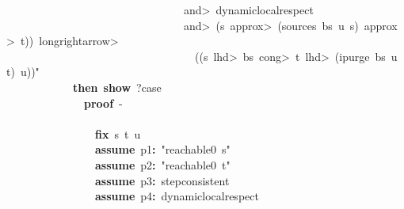 \documentclass{article}
\newcommand{\syntaxKEYWORDA}[1]{\textcolor[rgb]{0.0,0.4,0.6}{\textbf{#1}}}
\newcommand{\syntaxKEYWORDC}[1]{\textcolor[rgb]{0.0,0.6,1.0}{\textbf{#1}}}
\newcommand{\syntaxLITERALA}[1]{\textcolor[rgb]{1.0,0.0,0.8}{#1}}
\newcommand{\syntaxOPERATOR}[1]{\textcolor[rgb]{0.0,0.0,0.0}{\textbf{#1}}}
\newcommand{\syntaxKEYWORDA}[1]{\textcolor[rgb]{0.0,0.4,0.6}{\textbf{#1}}}
\newcommand{\syntaxKEYWORDC}[1]{\textcolor[rgb]{0.0,0.6,1.0}{\textbf{#1}}}
\newcommand{\syntaxLITERALA}[1]{\textcolor[rgb]{1.0,0.0,0.8}{#1}}
\newcommand{\syntaxOPERATOR}[1]{\textcolor[rgb]{0.0,0.0,0.0}{\textbf{#1}}}
\newcommand{\syntaxKEYWORDA}[1]{\textcolor[rgb]{0.0,0.4,0.6}{\textbf{#1}}}
\newcommand{\syntaxKEYWORDC}[1]{\textcolor[rgb]{0.0,0.6,1.0}{\textbf{#1}}}
\newcommand{\syntaxLITERALA}[1]{\textcolor[rgb]{1.0,0.0,0.8}{#1}}
\newcommand{\syntaxOPERATOR}[1]{\textcolor[rgb]{0.0,0.0,0.0}{\textbf{#1}}}
\newcommand{\syntaxKEYWORDA}[1]{\textcolor[rgb]{0.0,0.4,0.6}{#1}}
\newcommand{\syntaxKEYWORDC}[1]{\textcolor[rgb]{0.0,0.6,1.0}{#1}}
\newcommand{\syntaxLITERALA}[1]{\textcolor[rgb]{1.0,0.0,0.8}{\textbf{#1}}}
\newcommand{\syntaxOPERATOR}[1]{\textcolor[rgb]{0.0,0.0,0.0}{#1}}
\newcommand{\syntaxKEYWORDA}[1]{\textcolor[rgb]{0.0,0.4,0.6}{\textbf{#1}}}
\newcommand{\syntaxKEYWORDC}[1]{\textcolor[rgb]{0.0,0.6,1.0}{\textbf{#1}}}
\newcommand{\syntaxLITERALA}[1]{\textcolor[rgb]{1.0,0.0,0.8}{#1}}
\newcommand{\syntaxOPERATOR}[1]{\textcolor[rgb]{0.0,0.0,0.0}{\textbf{#1}}}
\newcommand{\syntaxKEYWORDA}[1]{\textcolor[rgb]{0.0,0.4,0.6}{\textbf{#1}}}
\newcommand{\syntaxKEYWORDC}[1]{\textcolor[rgb]{0.0,0.6,1.0}{\textbf{#1}}}
\newcommand{\syntaxLITERALA}[1]{\textcolor[rgb]{1.0,0.0,0.8}{#1}}
\newcommand{\syntaxOPERATOR}[1]{\textcolor[rgb]{0.0,0.0,0.0}{\textbf{#1}}}
\begin{document}
\syntaxLITERALA{{\ }{\ }{\ }{\ }{\ }{\ }{\ }{\ }{\ }{\ }{\ }{\ }{\ }{\ }{\ }{\ }{\ }{\ }{\ }{\ }{\ }{\ }{\ }{\ }{\ }{\ }{\ }{\ }{\ }{\ }{\ }{\ }\<and>{\ }dynamic\usebox{\underscorebox}local\usebox{\underscorebox}respect{\ }}\hspace*{\fill}\\
\syntaxLITERALA{{\ }{\ }{\ }{\ }{\ }{\ }{\ }{\ }{\ }{\ }{\ }{\ }{\ }{\ }{\ }{\ }{\ }{\ }{\ }{\ }{\ }{\ }{\ }{\ }{\ }{\ }{\ }{\ }{\ }{\ }{\ }{\ }\<and>{\ }(s{\ }\<approx>{\ }(sources{\ }bs{\ }u{\ }s){\ }\<approx>{\ }t)){\ }\<longrightarrow>}\hspace*{\fill}\\
\syntaxLITERALA{{\ }{\ }{\ }{\ }{\ }{\ }{\ }{\ }{\ }{\ }{\ }{\ }{\ }{\ }{\ }{\ }{\ }{\ }{\ }{\ }{\ }{\ }{\ }{\ }{\ }{\ }{\ }{\ }{\ }{\ }{\ }{\ }{\ }{\ }((s{\ }\<lhd>{\ }bs{\ }\<cong>{\ }t{\ }\<lhd>{\ }(ipurge{\ }bs{\ }u{\ }t){\ }\usebox{\atbox}{\ }u))"}\hspace*{\fill}\\
{\ }{\ }{\ }{\ }{\ }{\ }{\ }{\ }{\ }{\ }{\ }{\ }\syntaxKEYWORDA{then}{\ }\syntaxKEYWORDC{show}{\ }?case\hspace*{\fill}\\
{\ }{\ }{\ }{\ }{\ }{\ }{\ }{\ }{\ }{\ }{\ }{\ }{\ }{\ }\syntaxKEYWORDA{proof}{\ }{-}\hspace*{\fill}\\
{\ }{\ }{\ }{\ }{\ }{\ }{\ }{\ }{\ }{\ }{\ }{\ }{\ }{\ }\syntaxKEYWORDA{\usebox{\opencurlybracket}}{\ }\hspace*{\fill}\\
{\ }{\ }{\ }{\ }{\ }{\ }{\ }{\ }{\ }{\ }{\ }{\ }{\ }{\ }{\ }{\ }\syntaxKEYWORDC{fix}{\ }s{\ }t{\ }u\hspace*{\fill}\\
{\ }{\ }{\ }{\ }{\ }{\ }{\ }{\ }{\ }{\ }{\ }{\ }{\ }{\ }{\ }{\ }\syntaxKEYWORDC{assume}{\ }p1\syntaxOPERATOR{:}{\ }\syntaxLITERALA{"reachable0{\ }s"}\hspace*{\fill}\\
{\ }{\ }{\ }{\ }{\ }{\ }{\ }{\ }{\ }{\ }{\ }{\ }{\ }{\ }{\ }{\ }\syntaxKEYWORDC{assume}{\ }p2\syntaxOPERATOR{:}{\ }\syntaxLITERALA{"reachable0{\ }t"}\hspace*{\fill}\\
{\ }{\ }{\ }{\ }{\ }{\ }{\ }{\ }{\ }{\ }{\ }{\ }{\ }{\ }{\ }{\ }\syntaxKEYWORDC{assume}{\ }p3\syntaxOPERATOR{:}{\ }step\usebox{\underscorebox}consistent\hspace*{\fill}\\
{\ }{\ }{\ }{\ }{\ }{\ }{\ }{\ }{\ }{\ }{\ }{\ }{\ }{\ }{\ }{\ }\syntaxKEYWORDC{assume}{\ }p4\syntaxOPERATOR{:}{\ }dynamic\usebox{\underscorebox}local\usebox{\underscorebox}respect\hspace*{\fill}\\
\end{document}
